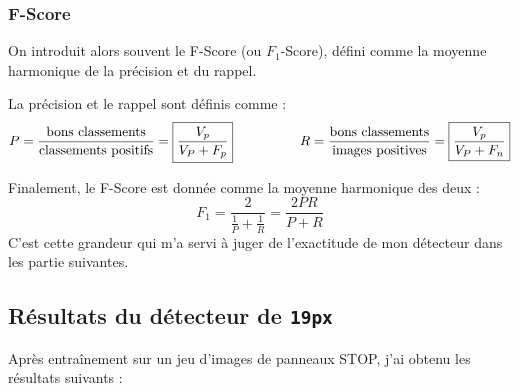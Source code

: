 \documentclass[12pt,a4paper]{article}
\begin{document}
\subsubsection{F-Score}
On introduit alors souvent le F-Score (ou $F_1$-Score), défini comme la moyenne harmonique de la précision et du rappel. \cite{powers}

La précision et le rappel sont définis comme :
\begin{equation}
    P = \frac{\textnormal{bons classements}}{\textnormal{classements positifs}} = \boxed{\frac{V_p}{V_P + F_p}}
    \hspace{5em}
    R = \frac{\textnormal{bons classements}}{\textnormal{images positives}} = \boxed{\frac{V_p}{V_P + F_n}}
\end{equation}

Finalement, le F-Score est donnée comme la moyenne harmonique des deux :
\begin{equation}
    \boxed{F_1 = \frac{2}{\frac{1}{P} + \frac{1}{R}} = \frac{2 P R}{P+R}}
\end{equation}
C'est cette grandeur qui m'a servi à juger de l'exactitude de mon détecteur dans les partie suivantes.

\subsection{Résultats du détecteur de \texttt{19px}}
Après entraînement sur un jeu d'images de panneaux STOP, j'ai obtenu les résultats suivants :
\renewcommand{\arraystretch}{1.3}
\begin{table}[h]
    
\end{table}
\end{document}
